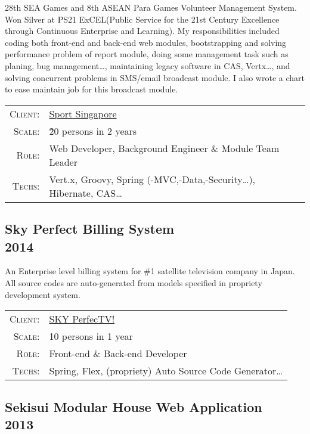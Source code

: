 \documentclass[a4paper,10pt]{article}
\begin{document}
28th SEA Games and 8th ASEAN Para Games Volunteer Management System.
Won Silver at PS21 ExCEL(Public Service for the 21st Century Excellence through Continuous Enterprise and Learning).
My responsibilities included coding both front-end and back-end web modules,
bootstrapping and solving performance problem of report module,
doing some management task such as planing, bug management\ldots,
maintaining legacy software in CAS, Vertx\ldots,
and solving concurrent problems in SMS/email broadcast module.
I also wrote a chart to ease maintain job for this broadcast module.

\begin{tabular}{rl}
    \textsc{Client:} & \href{http://www.sportsingapore.gov.sg/}{Sport Singapore}\\
    \textsc{Scale:} & \~20 persons in 2 years\\
    \textsc{Role:} & Web Developer, Background Engineer \& Module Team Leader\\
    \textsc{Techs:} & Vert.x, Groovy, Spring (-MVC,-Data,-Security\ldots), Hibernate, CAS\ldots\\
\end{tabular}


\subsection*{Sky Perfect Billing System\\\small 2014}

An Enterprise level billing system for \#1 satellite television company in Japan.
All source codes are auto-generated from models specified in propriety development system.

\begin{tabular}{rl}
    \textsc{Client:} & \href{https://www.skyperfectv.co.jp/eng/}{SKY PerfecTV!}\\
    \textsc{Scale:} & 10 persons in 1 year\\
    \textsc{Role:} & Front-end \& Back-end Developer\\
    \textsc{Techs:} & Spring, Flex, (propriety) Auto Source Code Generator\ldots\\
\end{tabular}

\subsection*{Sekisui Modular House Web Application\\\small 2013}
\end{document}
